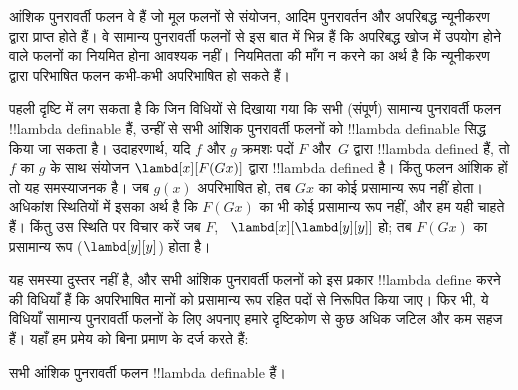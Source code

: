 \documentclass[../../../include/open-logic-section]{subfiles}
\begin{document}

आंशिक पुनरावर्ती फलन वे हैं जो मूल फलनों से संयोजन, आदिम पुनरावर्तन और
अपरिबद्ध न्यूनीकरण द्वारा प्राप्त होते हैं। वे सामान्य पुनरावर्ती फलनों से
इस बात में भिन्न हैं कि अपरिबद्ध खोज में उपयोग होने वाले फलनों का नियमित
होना आवश्यक नहीं। नियमितता की माँग न करने का अर्थ है कि न्यूनीकरण द्वारा
परिभाषित फलन कभी-कभी अपरिभाषित हो सकते हैं।

पहली दृष्टि में लग सकता है कि जिन विधियों से दिखाया गया कि सभी (संपूर्ण)
सामान्य पुनरावर्ती फलन !!{lambda definable} हैं, उन्हीं से सभी आंशिक
पुनरावर्ती फलनों को !!{lambda definable} सिद्ध किया जा सकता है। उदाहरणार्थ,
यदि $f$ और $g$ क्रमशः पदों $F$ और~$G$ द्वारा !!{lambda defined} हैं, तो
$f$ का $g$ के साथ संयोजन $\lambd[x][F (G x)]$ द्वारा !!{lambda defined}
है। किंतु फलन आंशिक हों तो यह समस्याजनक है। जब $g(x)$ अपरिभाषित हो, तब $G
x$ का कोई प्रसामान्य रूप नहीं होता। अधिकांश स्थितियों में इसका अर्थ है कि
$F (G x)$ का भी कोई प्रसामान्य रूप नहीं, और हम यही चाहते हैं। किंतु उस
स्थिति पर विचार करें जब $F$, ~$\lambd[x][\lambd[y][y]]$ हो; तब $F (G x)$
का प्रसामान्य रूप ($\lambd[y][y]$) होता है।

यह समस्या दुस्तर नहीं है, और सभी आंशिक पुनरावर्ती फलनों को इस प्रकार
!!{lambda define} करने की विधियाँ हैं कि अपरिभाषित मानों को प्रसामान्य रूप
रहित पदों से निरूपित किया जाए। फिर भी, ये विधियाँ सामान्य पुनरावर्ती फलनों
के लिए अपनाए हमारे दृष्टिकोण से कुछ अधिक जटिल और कम सहज हैं। यहाँ हम प्रमेय
को बिना प्रमाण के दर्ज करते हैं:

\begin{thm}
  सभी आंशिक पुनरावर्ती फलन !!{lambda definable} हैं।
\end{thm}
\end{document}
